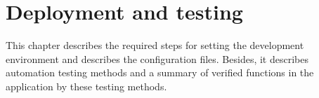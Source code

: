\chapter{Deployment and testing}\label{ch:mobile-application-implementation}

This chapter describes the required steps for setting the development environment and describes the configuration files.
Besides, it describes automation testing methods and a summary of verified functions in the application by these testing methods.







